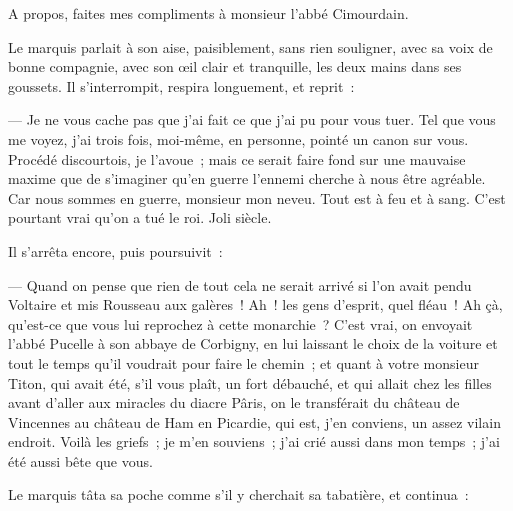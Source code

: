 \documentclass[french,twoside]{book} %
\begin{document}
A propos, faites mes compliments à monsieur l’abbé Cimourdain.\par
Le marquis parlait à son aise, paisiblement, sans rien souligner, avec sa voix de bonne compagnie, avec son œil clair et tranquille, les deux mains dans ses goussets. Il s’interrompit, respira longuement, et reprit :\par
— Je ne vous cache pas que j’ai fait ce que j’ai pu pour vous tuer. Tel que vous me voyez, j’ai trois fois, moi-même, en personne, pointé un canon sur vous. Procédé discourtois, je l’avoue ; mais ce serait faire fond sur une mauvaise maxime que de s’imaginer qu’en guerre l’ennemi cherche à nous être agréable. Car nous sommes en guerre, monsieur mon neveu. Tout est à feu et à sang. C’est pourtant vrai qu’on a tué le roi. Joli siècle.\par
Il s’arrêta encore, puis poursuivit :\par
— Quand on pense que rien de tout cela ne serait arrivé si l’on avait pendu Voltaire et mis Rousseau aux galères ! Ah ! les gens d’esprit, quel fléau ! Ah çà, qu’est-ce que vous lui reprochez à cette monarchie ? C’est vrai, on envoyait l’abbé Pucelle à son abbaye de Corbigny, en lui laissant le choix de la voiture et tout le temps qu’il voudrait pour faire le chemin ; et quant à votre monsieur Titon, qui avait été, s’il vous plaît,  un fort débauché, et qui allait chez les filles avant d’aller aux miracles du diacre Pâris, on le transférait du château de Vincennes au château de Ham en Picardie, qui est, j’en conviens, un assez vilain endroit. Voilà les griefs ; je m’en souviens ; j’ai crié aussi dans mon temps ; j’ai été aussi bête que vous.\par
Le marquis tâta sa poche comme s’il y cherchait sa tabatière, et continua :\par
\end{document}
